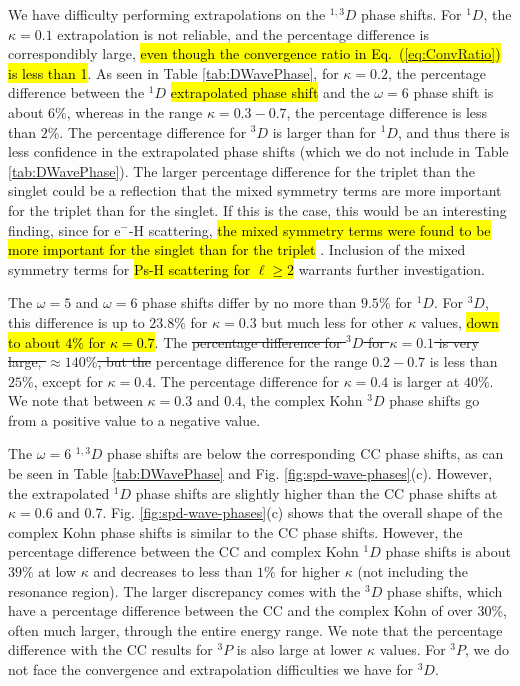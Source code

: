 \documentclass[preprint,showpacs,showkeys,preprintnumbers,amsmath,amssymb,longbibliography,pra,aps]{revtex4-1}
\newcommand{\todoi}{\todo[inline]}
\begin{document}
We have difficulty performing extrapolations on the $^{1,3}D$ phase shifts.
For $^1D$, the $\kappa = 0.1$ extrapolation is not reliable, and the
percentage difference is correspondibly large, \hl{even though the
convergence ratio in {Eq.~(\ref{eq:ConvRatio})} is less than 1}. As seen in Table
\ref{tab:DWavePhase}, for $\kappa = 0.2$, the percentage difference
between the $^1D$ \hl{extrapolated phase shift} and the $\omega = 6$ 
phase shift is about $6\%$,
whereas in the range $\kappa = 0.3 - 0.7$, the percentage difference is
less than $2\%$. The percentage difference for $^3D$ is larger than for $^1D$,
and thus there is less confidence in the extrapolated phase shifts (which we
do not include in Table \ref{tab:DWavePhase}). The larger percentage
difference for the triplet than the singlet could be a reflection that the
mixed symmetry terms are more important for the
triplet than for the singlet. If this is the case, this would be an interesting
finding, since for e$^-$-H scattering, \hl{the mixed symmetry terms were found to
be more important for the singlet than
for the triplet} \cite{VanReeth2015}. Inclusion of the mixed symmetry terms for
\hl{Ps-H scattering for $\ell \geq 2$} warrants further investigation.

The $\omega = 5$ and $\omega = 6$ phase shifts differ by no more than
$9.5\%$ for $^1D$. For $^3D$, this difference is up to $23.8\%$ for
$\kappa=0.3$ but much less for other $\kappa$ values, \hl{down to
about $4\%$ for $\kappa = 0.7$}.
The \sout{percentage difference for $^3D$ for $\kappa = 0.1$ is very large,
$\approx 140\%$, but the} percentage difference for the range $0.2 - 0.7$
is less than $25\%$, except for $\kappa = 0.4$. The percentage difference for
$\kappa = 0.4$ is larger at $40\%$. We note that between $\kappa = 0.3$
and $0.4$, the complex Kohn $^3D$ phase shifts go from a positive value to a
negative value.

\todoi{Do we really need $\omega = 6$ here? I think it's clear from the table.}
The $\omega = 6$ $^{1,3}D$ phase shifts are below the corresponding
CC phase shifts, as can be seen in Table \ref{tab:DWavePhase} and 
Fig. \ref{fig:spd-wave-phases}(c). However, the extrapolated $^1D$ phase
shifts are slightly higher than the CC phase shifts at $\kappa = 0.6$ and 0.7.
Fig. \ref{fig:spd-wave-phases}(c) shows that the overall shape of the complex 
Kohn phase shifts is similar to the CC phase shifts. However, the percentage
difference between the CC and complex Kohn $^1D$ phase shifts is
about $39\%$ at low $\kappa$ and decreases to less than $1\%$ for
higher $\kappa$ (not including the resonance region).
The larger discrepancy comes with the $^3D$ phase shifts,
which have a percentage difference between the CC and the complex Kohn
of over 30\%, often much larger, through the entire energy range. 
We note that the percentage difference with the CC results for $^3P$ is
also large at lower $\kappa$ values. For $^3P$, we do not face the
convergence and extrapolation difficulties we have for $^3D$.
\end{document}

